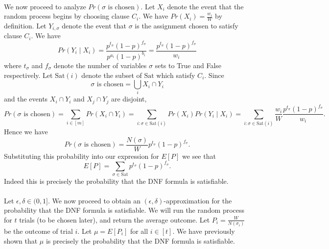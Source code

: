 \documentclass[letterpaper,12pt,oneside,onecolumn]{article}
\begin{document}
	\paragraph{}
	We now proceed to analyze $Pr(\sigma\text{ is chosen}).$ Let $X_i$ denote the event that the random process begins by choosing clause $C_i$. We have $Pr(X_i) = \frac{w_i}{W}$ by definition. Let $Y_{i,\sigma}$ denote the event that $\sigma$ is the assignment chosen to satisfy clause $C_i$. We have
	$$Pr(Y_i\mid X_i) = \frac{p^{t_\sigma}(1-p)^{f_\sigma}}{p^{a_i}(1-p)^{b_i}} = \frac{p^{t_\sigma}(1-p)^{f_\sigma}}{w_i}$$
	where $t_\sigma$ and $f_\sigma$ denote the number of variables $\sigma$ sets to True and False respectively. Let $\text{Sat}(i)$ denote the subset of $\text{Sat}$ which satisfy $C_i$. Since
	$$\sigma\text{ is chosen} = \bigcup_i X_i \cap Y_i$$
	and the events $X_i \cap Y_i$ and $X_j \cap Y_j$ are disjoint,
	$$Pr(\sigma\text{ is chosen}) = \sum_{i \in [m]}Pr(X_i \cap Y_i) = \sum_{i:\sigma \in \text{Sat}(i)} Pr(X_i)Pr(Y_i\mid X_i) = \sum_{i: \sigma \in \text{Sat}(i)} \frac{w_i}{W} \frac{p^{t_\sigma}(1-p)^{f_\sigma}}{w_i}.$$
	Hence we have
	$$Pr(\sigma\text{ is chosen}) = \frac{N(\sigma)}{W}p^{t_\sigma}(1-p)^{f_\sigma}.$$
	Substituting this probability into our expression for $E[P]$ we see that
	$$E[P] = \sum_{\sigma \in \text{Sat}}p^{t_\sigma}(1-p)^{f_\sigma}.$$
	Indeed this is precisely the probability that the DNF formula is satisfiable.
	\paragraph{}
	Let $\epsilon,\delta \in (0,1]$. We now proceed to obtain an $(\epsilon,\delta)$-approximation for the probability that the DNF formula is satisfiable. We will run the random process for $t$ trials (to be chosen later), and return the average outcome. Let $P_i = \frac{W}{N(\sigma_i)}$ be the outcome of trial $i$. Let $\mu = E[P_i]$ for all $i \in[t]$. We have previously shown that $\mu$ is precisely the probability that the DNF formula is satisfiable.
\end{document}
